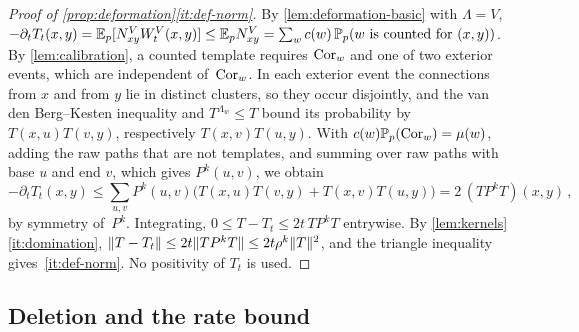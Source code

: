 \begin{proof}[Proof of \cref{prop:deformation}\ref{it:def-norm}]
By \cref{lem:deformation-basic} with $\Lambda=V$, $-\partial_tT_t(x,y)=\mathbb E_p[N^V_{xy}W^V_t(x,y)]\le\mathbb E_pN^V_{xy}=\sum_w
c(w)\,\mathbb P_p(w\text{ is counted for }(x,y))$. By \cref{lem:calibration}, a counted template requires
$\mathrm{Cor}_w$ and one of two exterior events, which are independent of~$\mathrm{Cor}_w$. In each exterior event the
connections from $x$ and from $y$ lie in distinct clusters, so they occur disjointly, and the
van den Berg--Kesten inequality and $T^{\Lambda_w}\le T$ bound its probability by $T(x,u)T(v,y)$,
respectively $T(x,v)T(u,y)$. With $c(w)\mathbb P_p(\mathrm{Cor}_w)=\mu(w)$, adding the raw paths that are not
templates, and summing over raw paths with base $u$ and end $v$, which gives $P^k(u,v)$, we obtain
\begin{equation*}
  -\partial_tT_t(x,y)\le\sum_{u,v}P^k(u,v)\bigl(T(x,u)T(v,y)+T(x,v)T(u,y)\bigr)=2\,(TP^kT)(x,y)\,,
\end{equation*}
by symmetry of~$P^k$. Integrating, $0\le T-T_t\le2t\,TP^kT$ entrywise. By
\cref{lem:kernels}\ref{it:domination}, $\lVert T-T_t\rVert\le2t\lVert TP^kT\rVert\le2t\rho^k\lVert T\rVert^2$, and the
triangle inequality gives~\ref{it:def-norm}. No positivity of $T_t$ is used.
\end{proof}

\subsection{Deletion and the rate bound}\label{sec:rate}

